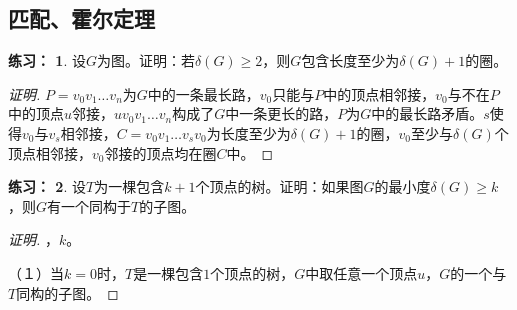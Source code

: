 \documentclass{beamer}
\theoremstyle{definition}
\theoremstyle{example}
\newtheorem*{Exercise}{练习：}
\begin{document}
\begin{CJK}{UTF8}{gbsn}
\section{匹配、霍尔定理}
\begin{frame}
  \begin{Exercise}
    设$G$为图。证明：若$\delta(G)\geq 2$，则$G$包含长度至少为$\delta(G)+1$的圈。  
    \end{Exercise}
    \begin{proof}[证明]\justifying\let\raggedright\justifying
      $P=v_0v_1\ldots v_n$为$G$中的一条最长路，$v_0$只能与$P$中的顶点相邻接，$v_0$与不在$P$中的顶点$u$邻接，$uv_0v_1\ldots v_n$构成了$G$中一条更长的路，$P$为$G$中的最长路矛盾。$s$使得$v_0$与$v_s$相邻接，$C=v_0v_1\ldots v_sv_0$为长度至少为$\delta(G)+1$的圈，$v_0$至少与$\delta(G)$个顶点相邻接，$v_0$邻接的顶点均在圈$C$中。
    \end{proof}
\end{frame}
\begin{frame}
  \begin{Exercise}
    设$T$为一棵包含$k+1$个顶点的树。证明：如果图$G$的最小度$\delta(G)\geq k$，则$G$有一个同构于$T$的子图。
  \end{Exercise}
  \begin{proof}[证明]\justifying\let\raggedright\justifying
    ，$k$。
  
  \pause（１）当$k=0$时，\pause$T$是一棵包含$1$个顶点的树，$G$中取任意一个顶点$u$，$G$的一个与$T$同构的子图。
  

\end{proof}
\end{frame}
\end{CJK}
\end{document}
